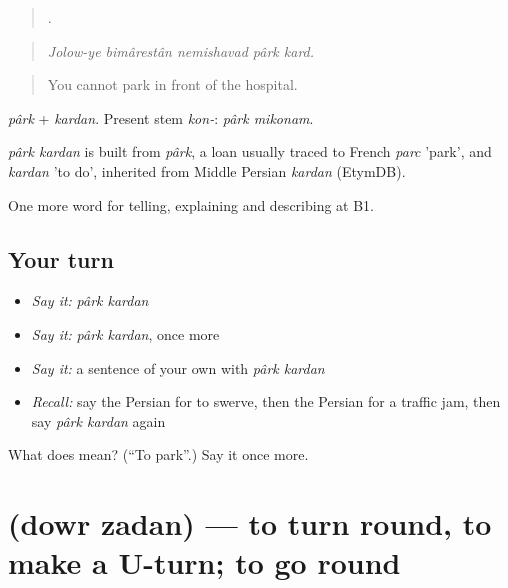\begin{quote}
    .
\end{quote}

\begin{quote}
\emph{Jolow-ye bimârestân nemishavad pârk kard.}
\end{quote}

\begin{quote}
You cannot park in front of the hospital.
\end{quote}

\emph{pârk} + \emph{kardan}. Present stem \emph{kon-}: \emph{pârk mikonam}.

\begin{cousinweb}
\emph{pârk kardan} is built from \emph{pârk}, a loan usually traced to French \emph{parc} 'park', and \emph{kardan} 'to do', inherited from Middle Persian \emph{kardan} (EtymDB).
\end{cousinweb}

\begin{grammarlens}[title={What you've built}]
One more word for telling, explaining and describing at B1.
\end{grammarlens}

\subsection*{Your turn}
\begin{itemize}
\raggedright
  \item \emph{Say it:} \emph{pârk kardan}
  \item \emph{Say it:} \emph{pârk kardan}, once more
  \item \emph{Say it:} a sentence of your own with \emph{pârk kardan}
  \item \emph{Recall:} say the Persian for to swerve, then the Persian for a traffic jam, then say \emph{pârk kardan} again
\end{itemize}

\begin{tcolorbox}[breakable,colback=teal!4,colframe=teal!35!black,title={Before you move on}]
What does   mean? (\textquotedblleft{}To park\textquotedblright{}.) Say it once more.
\end{tcolorbox}
\section[\texorpdfstring{\fa{دور} \fa{زدن} (dowr zadan)}{دور زدن (dowr zadan)}]{  (dowr zadan) — to turn round, to make a U-turn; to go round}


